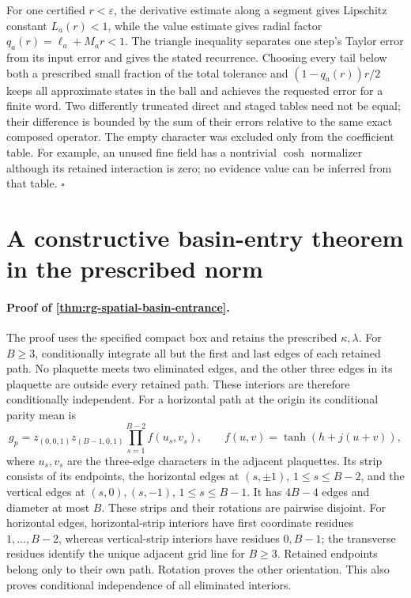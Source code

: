 For one certified \(r<\varepsilon\), the derivative estimate along a
segment gives Lipschitz constant \(L_a(r)<1\), while the value estimate
gives radial factor \(q_a(r)=\ell_a+M_ar<1\). The triangle inequality
separates one step's Taylor error from its input error and gives the
stated recurrence. Choosing every tail below both a prescribed small
fraction of the total tolerance and \((1-q_a(r))r/2\) keeps all
approximate states in the ball and achieves the requested error for a
finite word. Two differently truncated direct and staged tables need not
be equal; their difference is bounded by the sum of their errors relative
to the same exact composed operator. The empty character was excluded only
from the coefficient table. For example, an unused fine field has a
nontrivial \(\cosh\) normalizer although its retained interaction is zero;
no evidence value can be inferred from that table. \hfill\(\square\)
\section{A constructive basin-entry theorem in the prescribed norm}
\label{sec:rg-spatial-proof-basin}

\paragraph{Proof of \cref{thm:rg-spatial-basin-entrance}.}
The proof uses the specified compact box and retains the prescribed
\(\kappa,\lambda\). For \(B\ge3\), conditionally integrate all but the
first and last edges of each retained path. No plaquette meets two
eliminated edges, and the other three edges in its plaquette are outside
every retained path. These interiors are therefore conditionally
independent. For a horizontal path at the origin its conditional parity
mean is
\begin{equation}
 g_p=z_{(0,0,1)}z_{(B-1,0,1)}
        \prod_{s=1}^{B-2}f(u_s,v_s),\qquad
 f(u,v)=\tanh(h+j(u+v)),
 \label{eq:rg-spatial-proof-basin-strip}
\end{equation}
where \(u_s,v_s\) are the three-edge characters in the adjacent
plaquettes. Its strip consists of its endpoints, the horizontal edges at
\((s,\pm1)\), \(1\le s\le B-2\), and the vertical edges at
\((s,0),(s,-1)\), \(1\le s\le B-1\). It has \(4B-4\) edges and
diameter at most \(B\). These strips and their rotations are pairwise
disjoint. For horizontal edges, horizontal-strip interiors have first
coordinate residues \(1,\ldots,B-2\), whereas vertical-strip interiors
have residues \(0,B-1\); the transverse residues identify the unique
adjacent grid line for \(B\ge3\). Retained endpoints belong only to their
own path. Rotation proves the other orientation. This also proves
conditional independence of all eliminated interiors.

